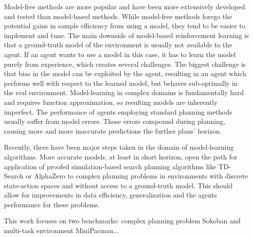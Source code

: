  Model-free methods are more popular and have been more extensively developed and tested than model-based methods. While model-free methods forego the potential gains in sample efficiency from using a model, they tend to be easier to implement and tune. The main downside of model-based reinforcement learning is that a ground-truth model of the environment is usually not available to the agent. If an agent wants to use a model in this case, it has to learn the model purely from experience, which creates several challenges. The biggest challenge is that bias in the model can be exploited by the agent, resulting in an agent which performs well with respect to the learned model, but behaves sub-optimally in the real environment. Model-learning in complex domains is fundamentally hard and requires function approximation, so resulting models are inherently imperfect. The performance of agents employing standard planning methods usually suffer from model errors. Those errors compound during planning, causing more and more inaccurate predictions the further plans' horizon.

 Recently, there have been major steps taken in the domain of model-learning algorithms\cite{Algo.RecurrentEnvSim}\cite{Algo.JointFrameRewardPrediction}\cite{Algo.FastGenerativeModels}\cite{Algo.PlaNet}. More accurate models, at least in short horizon, open the path for application of proofed simulation-based search planning algorithms like TD-Search\cite{Algo.TDSearch} or AlphaZero\cite{Algo.AlphaZero} to complex planning problems in environments with discrete state-action spaces and without access to a ground-truth model. This should allow for improvements in data efficiency, generalization and the agents performance for these problems.

 This work focuses on two benchmarks: complex planning problem Sokoban and multi-task environment MiniPacman... 
